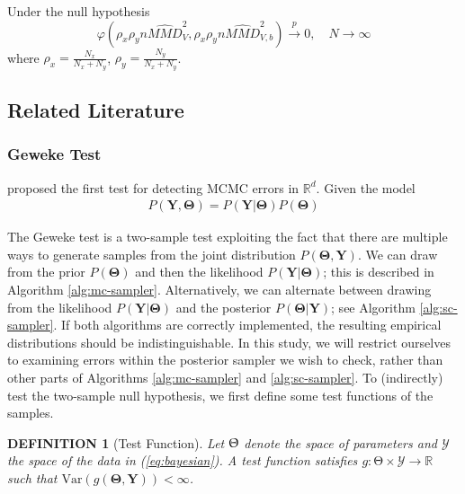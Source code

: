 \documentclass[a4paper,11pt]{article}
\newtheorem{definition}[theorem]{DEFINITION}
\newcommand{\var}{\mathrm{Var}}
\begin{document}
Under the null hypothesis
\begin{equation*}
    \varphi\left(\rho_{x} \rho_{y} n \widehat{MMD}_{V}^{2}, \rho_{x} \rho_{y} n \widehat{MMD}^{2}_{V, b}\right) \xrightarrow[]{p} 0, \quad N \rightarrow \infty
\end{equation*}
where $\rho_{x} = \frac{N_{x}}{N_{x} + N_{y}}$, $\rho_{y} = \frac{N_{y}}{N_{x} + N_{y}}$.

\subsection{Related Literature}
\subsubsection{Geweke Test}
\cite{geweke_getting_2004} proposed the first test for detecting MCMC errors in $\mathbb{R}^{d}$. Given the model
\begin{align}
    P(\mathbf{Y}, \mathbf{\Theta}) = P(\mathbf{Y} | \mathbf{\Theta}) P(\mathbf{\Theta})
    \label{eq:bayesian}
\end{align}

The Geweke test is a two-sample test exploiting the fact that there are multiple ways to generate samples from the joint distribution $P(\mathbf{\Theta}, \mathbf{Y})$. We can draw from the prior $P(\mathbf{\Theta})$ and then the likelihood $P(\mathbf{Y}| \mathbf{\Theta})$; this is described in Algorithm \ref{alg:mc-sampler}. Alternatively, we can alternate between drawing from the likelihood $P(\mathbf{Y}| \mathbf{\Theta})$ and the posterior $P(\mathbf{\Theta}|\mathbf{Y})$; see Algorithm \ref{alg:sc-sampler}. If both algorithms are correctly implemented, the resulting empirical distributions should be indistinguishable. In this study, we will restrict ourselves to examining errors within the posterior sampler we wish to check, rather than other parts of Algorithms \ref{alg:mc-sampler} and \ref{alg:sc-sampler}. To (indirectly) test the two-sample null hypothesis, we first define some test functions of the samples.

\begin{definition}[Test Function]
    Let $\mathbf{\Uptheta}$ denote the space of parameters and $\mathcal{Y}$ the space of the data in (\ref{eq:bayesian}). A test function satisfies $g:\mathrm{\Theta} \times \mathcal{Y} \rightarrow \mathbb{R}$ such that $\var(g(\mathbf{\Theta}, \mathbf{Y})) < \infty$. 
\end{definition}
\end{document}
